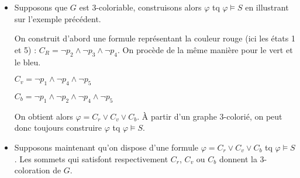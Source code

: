\documentclass{article}
\begin{document}
    \begin{itemize}
        \item Supposons que $G$ est 3-coloriable, construisons alors $\varphi$
        tq $\varphi \models S$ en illustrant sur l'exemple précédent.

        On construit d'abord une formule représentant la couleur rouge (ici les états 1 et 5) : $C_R = \neg p_2 \wedge \neg p_3 \wedge \neg p_4$. On procède de la même manière pour le
        vert et le bleu.

        $C_v = \neg p_1 \wedge \neg p_4 \wedge \neg p_5$

        $C_b = \neg p_1 \wedge \neg p_2 \wedge \neg p_4 \wedge \neg p_5$

        On obtient alors $\varphi = C_r \vee C_v \vee C_b$. \`A partir d'un
        graphe 3-colorié, on peut donc toujours construire $\varphi$ tq
        $\varphi \models S$.

        \item Supposons maintenant qu'on dispose d'une formule $\varphi = C_r \vee C_v \vee C_b$ tq $\varphi \models S$. Les sommets qui satisfont respectivement $C_r$,
        $C_v$ ou $C_b$ donnent la 3-coloration de $G$.

    \end{itemize}
\end{document}
